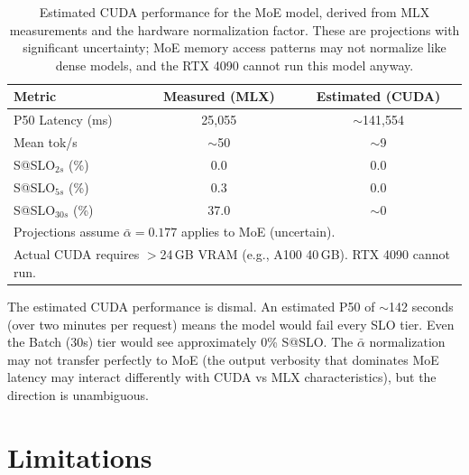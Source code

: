 \documentclass[11pt]{article}
\begin{document}
\begin{table}[t]
\centering
\caption{Estimated CUDA performance for the MoE model, derived from MLX measurements and the hardware normalization factor.  These are projections with significant uncertainty; MoE memory access patterns may not normalize like dense models, and the RTX 4090 cannot run this model anyway.}
\label{tab:estimated-cuda}
\small
\begin{tabular}{lcc}
\toprule
\textbf{Metric} & \textbf{Measured (MLX)} & \textbf{Estimated (CUDA)} \\
\midrule
P50 Latency (ms) & 25,055 & $\sim$141,554 \\
Mean tok/s & $\sim$50 & $\sim$9 \\
S@SLO$_{2s}$ (\%) & 0.0 & 0.0 \\
S@SLO$_{5s}$ (\%) & 0.3 & 0.0 \\
S@SLO$_{30s}$ (\%) & 37.0 & $\sim$0 \\
\bottomrule
\multicolumn{3}{l}{\footnotesize Projections assume $\bar{\alpha} = 0.177$ applies to MoE (uncertain).} \\
\multicolumn{3}{l}{\footnotesize Actual CUDA requires $>$24\,GB VRAM (e.g., A100 40\,GB).  RTX 4090 cannot run.} \\
\end{tabular}
\end{table}

The estimated CUDA performance is dismal.  An estimated P50 of ${\sim}$142 seconds (over two minutes per request) means the model would fail every SLO tier.  Even the Batch (30s) tier would see approximately 0\% S@SLO.  The $\bar{\alpha}$ normalization may not transfer perfectly to MoE (the output verbosity that dominates MoE latency may interact differently with CUDA vs MLX characteristics), but the direction is unambiguous.


\section{Limitations}
\label{sec:limitations}
\end{document}
